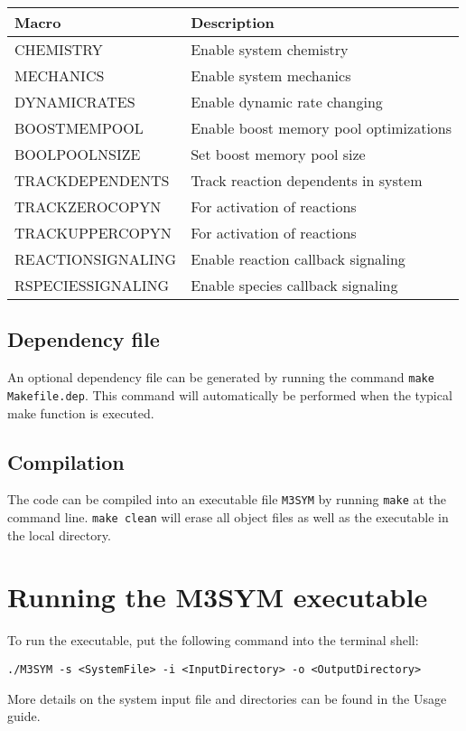 \documentclass[11pt, oneside]{article}   	%
\begin{document}
\begin{table} [!ht]
\centering
\begin{tabular}{|l|l|}  
\hline
 \textbf{Macro} & \textbf{Description} \\
 \hline
  CHEMISTRY & Enable system chemistry \\
  \hline
  MECHANICS & Enable system mechanics \\ 
  \hline
  DYNAMICRATES & Enable dynamic rate changing \\
  \hline
  BOOSTMEMPOOL & Enable boost memory pool optimizations \\
  \hline
   BOOLPOOLNSIZE & Set boost memory pool size \\
  \hline
   TRACKDEPENDENTS & Track reaction dependents in system \\
  \hline
    TRACKZEROCOPYN & For activation of reactions \\
  \hline
     TRACKUPPERCOPYN & For activation of reactions \\
  \hline
     REACTIONSIGNALING & Enable reaction callback signaling \\
  \hline
     RSPECIESSIGNALING & Enable species callback signaling\\
  \hline
\end{tabular}
\end{table}

	
\subsection {Dependency file}

An optional dependency file can be generated by running the command  \texttt{make Makefile.dep}. This command will automatically be performed when the typical make function is executed.

\subsection{Compilation}

The code can be compiled into an executable file \texttt{M3SYM} by running \texttt{make} at the command line. \texttt{make clean} will erase all object files as well as the executable in the local directory.

\section {Running the M3SYM executable}

To run the executable, put the following command into the terminal shell: \newline \newline \centerline{\texttt{./M3SYM -s <SystemFile> -i <InputDirectory> -o <OutputDirectory>}} \newline \newline More details on the system input file and directories can be found in the Usage guide.
\end{document}
